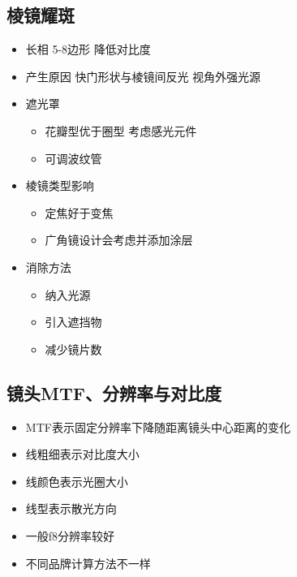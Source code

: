 \documentclass[
  letterpaper,
  DIV=11,
  numbers=noendperiod]{scrreprt}
\providecommand{\tightlist}{%
  \setlength{\itemsep}{0pt}\setlength{\parskip}{0pt}}\usepackage{longtable,booktabs,array}
\begin{document}
\subsection{棱镜耀斑}\label{ux68f1ux955cux8000ux6591}

\begin{itemize}
\tightlist
\item
  长相 5-8边形 降低对比度
\item
  产生原因 快门形状与棱镜间反光 视角外强光源
\item
  遮光罩

  \begin{itemize}
  \tightlist
  \item
    花瓣型优于圈型 考虑感光元件
  \item
    可调波纹管
  \end{itemize}
\item
  棱镜类型影响

  \begin{itemize}
  \tightlist
  \item
    定焦好于变焦
  \item
    广角镜设计会考虑并添加涂层
  \end{itemize}
\item
  消除方法

  \begin{itemize}
  \tightlist
  \item
    纳入光源
  \item
    引入遮挡物
  \item
    减少镜片数
  \end{itemize}
\end{itemize}

\subsection{镜头MTF、分辨率与对比度}\label{ux955cux5934mtfux5206ux8fa8ux7387ux4e0eux5bf9ux6bd4ux5ea6}

\begin{itemize}
\tightlist
\item
  MTF表示固定分辨率下降随距离镜头中心距离的变化
\item
  线粗细表示对比度大小
\item
  线颜色表示光圈大小
\item
  线型表示散光方向
\item
  一般f8分辨率较好
\item
  不同品牌计算方法不一样
\end{itemize}
\end{document}
